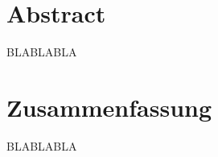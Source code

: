 \chapter*{Abstract}
\thispagestyle{empty} %

BLABLABLA

\newpage

\chapter*{Zusammenfassung}
\thispagestyle{empty} %

BLABLABLA

\newpage